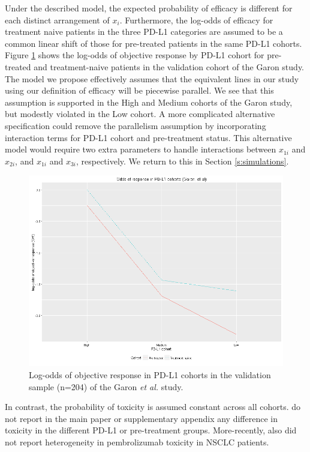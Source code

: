 \documentclass[alpha-refs]{wiley-article}
\begin{document}
Under the described model, the expected probability of efficacy is different for each distinct arrangement of $x_i$.
Furthermore, the log-odds of efficacy for treatment naive patients in the three PD-L1 categories are assumed to be a common linear shift of those for pre-treated patients in the same PD-L1 cohorts.
Figure \ref{fig:garon.response.logodds} shows the log-odds of objective response by PD-L1 cohort for pre-treated and treatment-naive patients in the validation cohort of the Garon study. 
The model we propose effectively assumes that the equivalent lines in our study using our definition of efficacy will be piecewise parallel.
We see that this assumption is supported in the High and Medium cohorts of the Garon study, but modestly violated in the Low cohort.
A more complicated alternative specification could remove the parallelism assumption by incorporating interaction terms for PD-L1 cohort and pre-treatment status.
This alternative model would require two extra parameters to handle interactions between $x_{1i}$ and $x_{2i}$, and $x_{1i}$ and $x_{3i}$, respectively.
We return to this in Section \ref{s:simulations}.

\begin{figure}[p]
	\centering
	\includegraphics[width=\linewidth]{LogOddsOfResponseByCohort-Garon}
	\caption{Log-odds of objective response in PD-L1 cohorts in the validation sample (n=204) of the Garon \textit{et al.} study.}
	\label{fig:garon.response.logodds}
\end{figure}

In contrast, the probability of toxicity is assumed constant across all cohorts.
\cite{Garon2015} do not report in the main paper or supplementary appendix any difference in toxicity in the different PD-L1 or pre-treatment groups.
More-recently, \cite{Herbst2016} also did not report heterogeneity in pembrolizumab toxicity in NSCLC patients.
\end{document}
